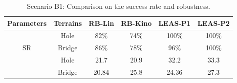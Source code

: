 \begin{table}[h]
\centering
\caption{Scenario B1: Comparison on the success rate and robustness.}
\begin{tabular}{ |c|c|c|c|c|c| }
    \hline
    Parameters & Terrains & RB-Lin & RB-Kino & LEAS-P1 & LEAS-P2\\
    \hline \hline
    \multirow{3}{*}{SR} & Hole & 82\% & 74\% & 100\% & 100\% \\
    \cline{2-6}
                        & Bridge & 86\% & 78\% & 96\% & 100\% \\
    \hline \hline
    \multirow{3}{*}{Robustness} & Hole & 21.7 & 20.9 & 32.2 & 33.3 \\
    \cline{2-6}
                        & Bridge & 20.84 & 25.8 & 24.36 & 27.3 \\
    \hline
\end{tabular}
\label{tab:cp-sb:hole_bridge}
\end{table}

